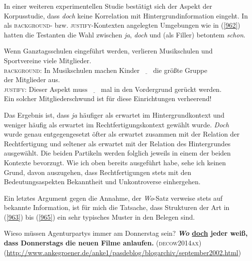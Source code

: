 {In einer weiteren experimentellen Studie bestätigt sich der Aspekt der Korpusstudie, dass \textit{doch} keine Korrelation mit Hintergrundinformation eingeht. In als \textsc{background}- bzw. \textsc{justify}-Kontexten angelegten Umgebungen wie in (\ref{962}) hatten die Testanten die Wahl zwischen \textit{ja}, \textit{doch} und (als Filler) betontem \textit{schon}.\largerpage

\begin{exe}
	\ex\label{962}
	Wenn Ganztagsschulen eingeführt werden, verlieren Musikschulen und Sportvereine viele Mitglieder.\medskip\\
	\noindent
	\textsc{background}: In Musikschulen machen Kinde$\textrm{r}\underline{\qquad}\textrm{d}$ie größte Gruppe \\
	der Mitglieder aus.\\
	\textsc{justify}: Dieser Aspekt mus$\textrm{s}\underline{\qquad}\textrm{m}$al in den Vordergrund gerückt werden.\\
	\noindent
	Ein solcher Mitgliederschwund ist für diese Einrichtungen verheerend!	
	\newline
	\hbox{}\hfill\hbox{\citet[90--91]{Doering2014}}
\end{exe}		
Das Ergebnis ist, dass \textit{ja} häufiger als erwartet im Hintergrundkontext und weniger häufig als erwartet im Rechtfertigungskontext gewählt wurde. \textit{Doch} wurde genau entgegengesetzt öfter als erwartet zusammen mit der Relation der Rechtfertigung und seltener als erwartet mit der Relation des Hintergrundes ausgewählt. Die beiden Partikeln werden folglich jeweils in einem der beiden Kontexte bevorzugt. Wie ich oben bereits ausgeführt habe, sehe ich keinen Grund, davon auszugehen, dass Rechtfertigungen stets mit den Bedeutungsaspekten Bekanntheit und Unkontroverse einhergehen.
 
Ein letztes Argument gegen die Annahme, der \textit{Wo}-Satz verweise stets auf bekannte Information, ist für mich die Tatsache, dass Strukturen der Art in (\ref{963}) bis (\ref{965}) ein sehr typisches Muster in den Belegen sind.

\begin{exe}
	\ex\label{963}

	Wieso müssen Agenturpartys immer am Donnerstag sein? \textbf{\textit{Wo} \ul{doch} jeder weiß, dass Donnerstags die neuen Filme anlaufen.}	
	\hfill\hbox{\scshape(decow2014ax)}
	\newline
	{\scriptsize(\url{http://www.ankegroener.de/anke1/pasdeblog/blogarchiv/september2002.html})}
\end{exe}

}
